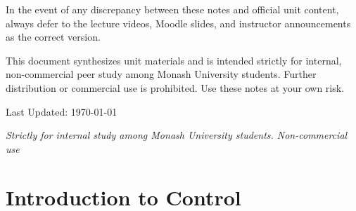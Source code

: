 \documentclass[12pt,onecolumn,twoside ]{article}
\begin{document}
	In the event of any discrepancy between these notes and official unit content, always defer to the lecture videos, Moodle slides, and instructor announcements as the correct version.
		
	This document synthesizes unit materials and is intended strictly for internal, non-commercial peer study among Monash University students. Further distribution or commercial use is prohibited. Use these notes at your own risk.
	
 	\vspace*{0.5cm}
	
	{\small Last Updated: \today}
	
	\vfill
	
	\begin{center}
		\textit{\footnotesize\color{gray}
		Strictly for internal study among Monash University students. Non-commercial use}
	\end{center}
	
	\clearpage
	
	
	\newpage
	
	\section{Introduction to Control}
	
\end{document}
